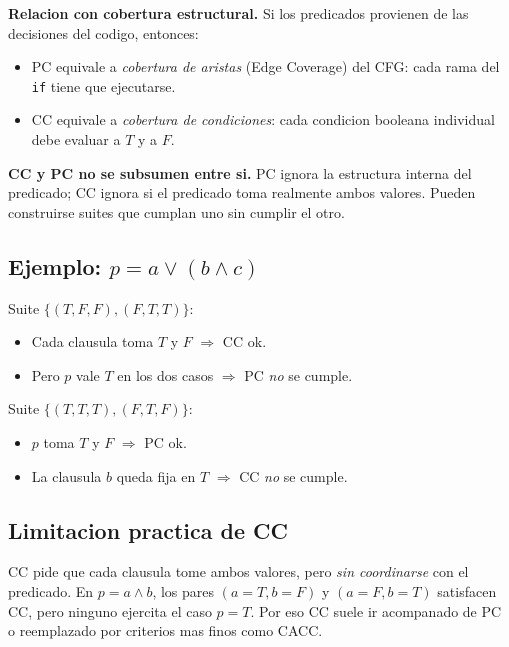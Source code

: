 \documentclass[12pt,a4paper]{article}
\begin{document}
\textbf{Relacion con cobertura estructural.} Si los predicados provienen de las decisiones del
codigo, entonces:

\begin{itemize}
  \item PC equivale a \emph{cobertura de aristas} (Edge Coverage) del CFG: cada rama del
  \texttt{if} tiene que ejecutarse.
  \item CC equivale a \emph{cobertura de condiciones}: cada condicion booleana individual debe
  evaluar a $T$ y a $F$.
\end{itemize}

\begin{ideabox}
\textbf{CC y PC no se subsumen entre si.} PC ignora la estructura interna del predicado; CC
ignora si el predicado toma realmente ambos valores. Pueden construirse suites que cumplan uno
sin cumplir el otro.
\end{ideabox}

\subsection{Ejemplo: \texorpdfstring{$p = a \vee (b \wedge c)$}{p = a or (b and c)}}

\begin{ejemplobox}
Suite $\{(T,F,F), (F,T,T)\}$:
\begin{itemize}
  \item Cada clausula toma $T$ y $F$ $\Rightarrow$ CC ok.
  \item Pero $p$ vale $T$ en los dos casos $\Rightarrow$ PC \emph{no} se cumple.
\end{itemize}

Suite $\{(T,T,T), (F,T,F)\}$:
\begin{itemize}
  \item $p$ toma $T$ y $F$ $\Rightarrow$ PC ok.
  \item La clausula $b$ queda fija en $T$ $\Rightarrow$ CC \emph{no} se cumple.
\end{itemize}
\end{ejemplobox}

\subsection{Limitacion practica de CC}

CC pide que cada clausula tome ambos valores, pero \emph{sin coordinarse} con el predicado. En
$p = a \wedge b$, los pares $(a=T,b=F)$ y $(a=F,b=T)$ satisfacen CC, pero ninguno ejercita el
caso $p=T$. Por eso CC suele ir acompanado de PC o reemplazado por criterios mas finos como
CACC.
\end{document}
